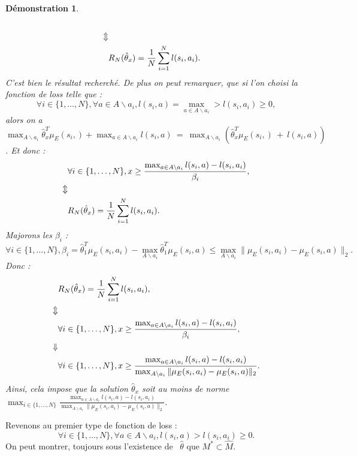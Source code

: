 \documentclass[publibook-draft]{CAp2012}
\newtheorem{preuve}{Démonstration}
\begin{document}
{\begin{preuve}
\begin{align}
\\
\nonumber\Updownarrow
\\
&R_N(\hat{\theta}_x)={1\over N} \sum_{i=1}^N l(s_i,a_i).
\end{align}
C'est bien le résultat recherché.
De plus on peut remarquer, que si l'on choisi la fonction de loss telle que :
\begin{equation}
\forall i\in\{1,\dots,N\}, \forall a \in A \backslash a_i, l(s_i,a)=\max_{a \in A \backslash a_i}>l(s_i,a_i)\geq0,
\end{equation}
alors on a ~$\max_{A \backslash a_i}\hat{\theta}_x^T\mu_E(s_i,)+\max_{a\in A \backslash a_i}l(s_i,a)~=~\max_{A \backslash a_i}(\hat{\theta}_x^T\mu_E(s_i,)~+~l(s_i,a))$. Et donc :
\begin{align}
&\forall i\in\{1,\dots,N\}, x\geq\frac{\max_{a\in A \backslash a_i}l(s_i,a)-l(s_i,a_i)}{\beta_i},
\\
\nonumber\Updownarrow
\\
&R_N(\hat{\theta}_x)={1\over N} \sum_{i=1}^N l(s_i,a_i).
\end{align}
Majorons les $\beta_i$ :
\begin{equation}
\forall i\in\{1,\dots,N\}, \beta_i=\hat{\theta}_1^T\mu_E(s_i,a_i)-\max_{A \backslash a_i}\hat{\theta}_1^T\mu_E(s_i,a)\leq\max_{A \backslash a_i}\|\mu_E(s_i,a_i)-\mu_E(s_i,a)\|_2.
\end{equation}
Donc :
\begin{align}
&R_N(\hat{\theta}_x)={1\over N} \sum_{i=1}^N l(s_i,a_i),
\\
\nonumber\Updownarrow
\\
&\forall i\in\{1,\dots,N\}, x\geq\frac{\max_{a\in A \backslash a_i}l(s_i,a)-l(s_i,a_i)}{\beta_i},
\\
\nonumber\Downarrow
\\
&\forall i\in\{1,\dots,N\}, x\geq\frac{\max_{a\in A \backslash a_i}l(s_i,a)-l(s_i,a_i)}{\max_{A \backslash a_i}\|\mu_E(s_i,a_i)-\mu_E(s_i,a)\|_2}.
\end{align}
Ainsi, cela impose que la solution $\hat{\theta}_x$ soit au moins de norme $\max_{i\in\{1,\dots,N\}}\frac{\max_{a\in A \backslash a_i}l(s_i,a)-l(s_i,a_i)}{\max_{A \backslash a_i}\|\mu_E(s_i,a_i)-\mu_E(s_i,a)\|_2}$.
\end{preuve}
Revenons au premier type de fonction de loss :
\begin{equation}
\forall i\in\{1,\dots,N\}, \forall a \in A \backslash a_i, l(s_i,a)>l(s_i,a_i)\geq0.
\end{equation}
On peut montrer, toujours sous l'existence de ~$\hat{\theta}$ que $M^*\subset\hat{M}$.
}
\end{document}
